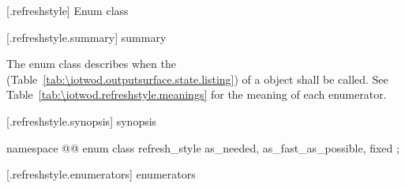  [\iotwod.refreshstyle] {Enum class }

 [\iotwod.refreshstyle.summary] { summary}

\pnum
The  enum class describes when the  (Table~\ref{tab:\iotwod.outputsurface.state.listing}) of a  object shall be called. See Table~\ref{tab:\iotwod.refreshstyle.meanings} for the meaning of each  enumerator.

 [\iotwod.refreshstyle.synopsis] { synopsis}

\begin{codeblock}
namespace @\fullnamespace{}@ {
  enum class refresh_style {
    as_needed,
    as_fast_as_possible,
    fixed
  };
}
\end{codeblock}

 [\iotwod.refreshstyle.enumerators] { enumerators}


